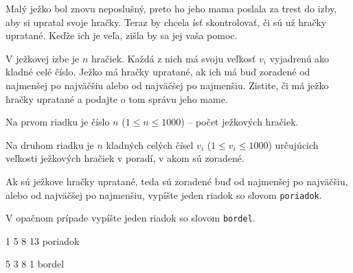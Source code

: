 




Malý ježko bol znovu neposlušný, preto ho jeho mama poslala za trest do izby, aby si upratal svoje
hračky. Teraz by chcela ísť skontrolovať, či sú už hračky upratané. Keďže ich je veľa, zišla by
sa jej vaša pomoc.


V ježkovej izbe je $n$ hračiek. Každá z nich má svoju veľkosť $v_i$ vyjadrenú ako kladné celé číslo.
Ježko má hračky upratané, ak ich má buď zoradené od najmenšej po najväčšiu alebo od najväčšej po
najmenšiu. Zistite, či má ježko hračky upratané a podajte o tom správu jeho mame.


Na prvom riadku je číslo $n$ ($1 \leq n \leq 1000$) -- počet ježkových hračiek.

Na druhom riadku je $n$ kladných celých čísel $v_i$ ($1 \leq v_i \leq 1000$) určujúcich veľkosti
ježkových hračiek v poradí, v akom sú zoradené.


Ak sú ježkove hračky upratané, teda sú zoradené buď od najmenšej po najväčšiu, alebo od najväčšej po
najmenšiu, vypíšte jeden riadok so slovom \texttt{poriadok}.

V opačnom prípade vypíšte jeden riadok so slovom \texttt{bordel}.


1 5 8 13
\vystup
poriadok
\koniec

5 3 8 1
\vystup
bordel
\koniec


